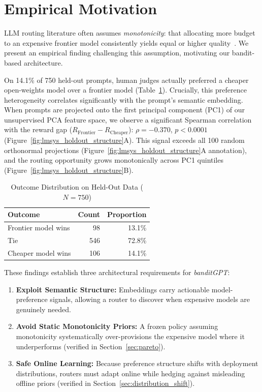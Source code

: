 \section{Empirical Motivation}
\label{sec:motivation}

LLM routing literature often assumes \emph{monotonicity}: that allocating more budget to an expensive frontier model consistently yields equal or higher quality~\cite{ong2024routellm, chen2023frugalgpt}. We present an empirical finding challenging this assumption, motivating our bandit-based architecture.

On 14.1\% of 750 held-out prompts, human judges actually preferred a cheaper open-weights model over a frontier model (Table~\ref{tab:outcome_distribution}). Crucially, this preference heterogeneity correlates significantly with the prompt's semantic embedding. When prompts are projected onto the first principal component (PC1) of our unsupervised PCA feature space, we observe a significant Spearman correlation with the reward gap ($R_{\text{Frontier}} - R_{\text{Cheaper}}$): $\rho = -0.370$, $p < 0.0001$ (Figure~\ref{fig:lmsys_holdout_structure}A). This signal exceeds all 100 random orthonormal projections (Figure~\ref{fig:lmsys_holdout_structure}A annotation), and the routing opportunity grows monotonically across PC1 quintiles (Figure~\ref{fig:lmsys_holdout_structure}B).

\begin{table}[htbp]
\centering
\small
\caption{Outcome Distribution on Held-Out Data ($N=750$)}
\label{tab:outcome_distribution}
\begin{tabular}{@{}lrr@{}}
\toprule
\textbf{Outcome} & \textbf{Count} & \textbf{Proportion} \\
\midrule
Frontier model wins & 98 & 13.1\% \\
Tie & 546 & 72.8\% \\
Cheaper model wins & 106 & 14.1\% \\
\bottomrule
\end{tabular}
\end{table}



These findings establish three architectural requirements for \textit{banditGPT}:
\begin{enumerate}[noitemsep,topsep=2pt,leftmargin=*]
    \item \textbf{Exploit Semantic Structure:} Embeddings carry actionable model-preference signals, allowing a router to discover when expensive models are genuinely needed.
    \item \textbf{Avoid Static Monotonicity Priors:} A frozen policy assuming monotonicity systematically over-provisions the expensive model where it underperforms (verified in Section~\ref{sec:pareto}).
    \item \textbf{Safe Online Learning:} Because preference structure shifts with deployment distributions, routers must adapt online while hedging against misleading offline priors (verified in Section~\ref{sec:distribution_shift}).
\end{enumerate}
